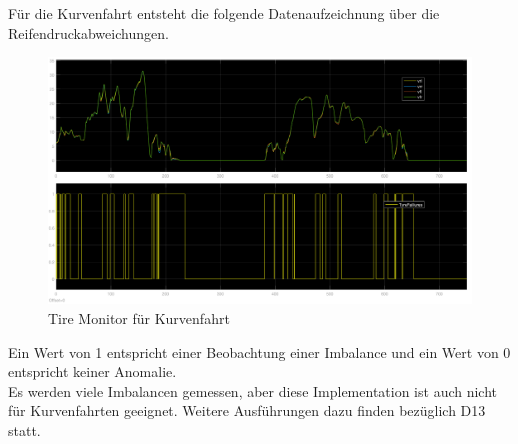 Für die Kurvenfahrt entsteht die folgende Datenaufzeichnung über die Reifendruckabweichungen.
\begin{figure}[H]
	\centering
	\includegraphics[width=0.95\linewidth]{../Graphiken/CurvesTireMonitor.png}
	\caption{Tire Monitor für Kurvenfahrt}
\end{figure}
Ein Wert von 1  entspricht einer Beobachtung einer Imbalance und ein Wert von 0 entspricht keiner Anomalie.
\\
Es werden viele Imbalancen gemessen, aber diese Implementation ist auch nicht für Kurvenfahrten geeignet. Weitere Ausführungen dazu finden bezüglich D13 statt.







	
	

	
	
	
	